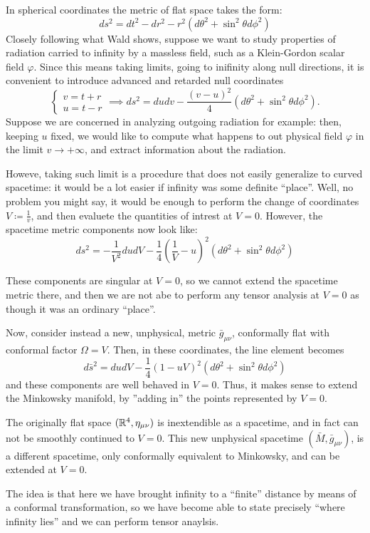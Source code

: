 In spherical coordinates the metric of flat space takes the form:
\[
ds^2 = dt^2 - dr^2 - r^2(d\theta^2 + \sin^2\theta d\phi^2)
\]
Closely following what Wald shows, suppose we want to study properties of radiation carried to infinity by a massless field, such as a Klein-Gordon scalar field \(\varphi\). Since this means taking limits, going to inifinity along null directions, it is convenient to introduce advanced and retarded null coordinates
\[
\begin{cases}
	 v = t + r\\
	 u = t - r
\end{cases}
\implies 
ds^2 = dudv - \frac{(v - u)^2}{4}(d\theta^2 + \sin^2\theta d\phi^2).
\]
Suppose we are concerned in analyzing outgoing radiation for example: then, keeping \(u\) fixed, we would like to compute what happens to out physical field \(\varphi\) in the limit \(v \rightarrow +\infty\), and extract information about the radiation.

Howeve, taking such limit is a procedure that does not easily generalize to curved spacetime: it would be a lot easier if infinity was some definite ``place''. Well, no problem you might say, it would be enough to perform the change of coordinates \(V\coloneqq \frac{1}{v}\), and then evaluete the quantities of intrest at \(V = 0\). However, the spacetime metric components now look like:
\[
ds^2 = -\frac{1}{V^2}dudV - \frac{1}{4}\left(\frac{1}{V} - u\right)^2 (d\theta^2 + \sin^2\theta d\phi^2)
\]

These components are singular at \(V = 0\), so we cannot extend the spacetime metric there, and then we are not abe to perform any tensor analysis at \(V = 0\) as though it was an ordinary ``place''. 

Now, consider instead a new, unphysical, metric \(\bar{g}_{\mu\nu}\), conformally flat with conformal factor \(\Omega = V\). Then, in these coordinates, the line element becomes
\[
d\bar{s}^2 = dudV - \frac{1}{4}\left(1- uV\right)^2 (d\theta^2 + \sin^2\theta d\phi^2)
\]
and these components are well behaved in \(V = 0\). Thus, it makes sense to extend the Minkowsky manifold, by ''adding in'' the points represented by \(V = 0\).
\begin{remark}
	The originally flat space \(({\mathbb{R}}^4, \eta_{\mu\nu})\) is inextendible as a spacetime, and in fact can not be smoothly continued to \(V = 0\). This new unphysical spacetime \((\bar{M},\bar{g}_{\mu\nu} )\), is a different spacetime, only conformally equivalent to Minkowsky, and can be extended at \(V = 0\).
\end{remark}
The idea is that here we have brought infinity to a ``finite'' distance by means of a conformal transformation, so we have become able to state precisely ``where infinity lies'' and we can perform tensor anaylsis.


